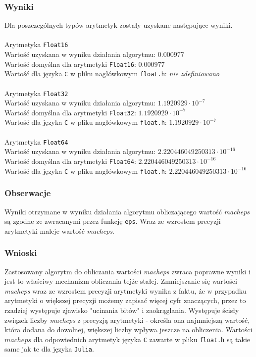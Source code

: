 \documentclass{article}
\begin{document}
\subsubsection{Wyniki}
Dla poszczególnych typów arytmetyk zostały uzyskane następujące wyniki. \\\\
Arytmetyka \texttt{Float16} \\
Wartość uzyskana w wyniku działania algorytmu: $0.000977$ \\
Wartość domyślna dla arytmetyki \texttt{Float16}: $0.000977$ \\
Wartość dla języka \texttt{C} w pliku nagłówkowym \texttt{float.h}: \textit{nie zdefiniowano} \\\\
Arytmetyka \texttt{Float32} \\
Wartość uzyskana w wyniku działania algorytmu: $1.1920929 \cdot 10^{-7}$ \\
Wartość domyślna dla arytmetyki \texttt{Float32}: $1.1920929 \cdot 10^{-7}$ \\
Wartość dla języka \texttt{C} w pliku nagłówkowym \texttt{float.h}: $1.1920929 \cdot 10^{-7}$ \\\\
Arytmetyka \texttt{Float64} \\
Wartość uzyskana w wyniku działania algorytmu: $2.220446049250313 \cdot 10^{-16}$ \\
Wartość domyślna dla arytmetyki \texttt{Float64}: $2.220446049250313 \cdot 10^{-16}$ \\
Wartość dla języka \texttt{C} w pliku nagłówkowym \texttt{float.h}: $2.220446049250313 \cdot 10^{-16}$ 

\subsubsection{Obserwacje}
Wyniki otrzymane w wyniku działania algorytmu obliczającego wartość \textit{macheps} są zgodne ze zwracanymi przez funkcję \texttt{eps}. Wraz ze wzrostem precyzji arytmetyki maleje wartość \textit{macheps}.

\subsubsection{Wnioski}
Zastosowany algorytm do obliczania wartości \textit{macheps} zwraca poprawne wyniki i jest to właściwy mechanizm obliczania tejże stałej. Zmniejszanie się wartości \textit{macheps} wraz ze wzrostem precyzji arytmetyki wynika z faktu, że w przypadku arytmetyki o większej precyzji możemy zapisać więcej cyfr znaczących, przez to rzadziej występuje zjawisko "ucinania bitów" i zaokrąglania. Występuje ścisły związek liczby \textit{macheps} z precyzją arytmetyki - określa ona najmniejszą wartość, która dodana do dowolnej, większej liczby wpływa jeszcze na obliczenia. Wartości $macheps$ dla odpowiednich arytmetyk języka \texttt{C} zawarte w pliku \texttt{float.h} są takie same jak te dla języka \texttt{Julia}.
\end{document}
